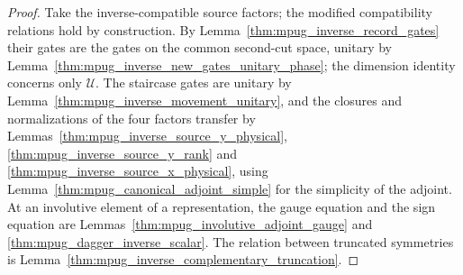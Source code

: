 \begin{proof}\leanok
    Take the inverse-compatible source factors; the modified compatibility
    relations hold by construction. By
    Lemma~\ref{thm:mpug_inverse_record_gates} their gates are the gates on the
    common second-cut space, unitary by
    Lemma~\ref{thm:mpug_inverse_new_gates_unitary_phase}; the dimension
    identity concerns only $\mathcal U$. The staircase gates are unitary by
    Lemma~\ref{thm:mpug_inverse_movement_unitary}, and the closures and
    normalizations of the four factors transfer by
    Lemmas~\ref{thm:mpug_inverse_source_y_physical},
    \ref{thm:mpug_inverse_source_y_rank} and
    \ref{thm:mpug_inverse_source_x_physical}, using
    Lemma~\ref{thm:mpug_canonical_adjoint_simple} for the simplicity of the
    adjoint. At an involutive element of a representation, the gauge
    equation and the sign equation are
    Lemmas~\ref{thm:mpug_involutive_adjoint_gauge} and
    \ref{thm:mpug_dagger_inverse_scalar}. The relation between truncated
    symmetries is Lemma~\ref{thm:mpug_inverse_complementary_truncation}.
\end{proof}

